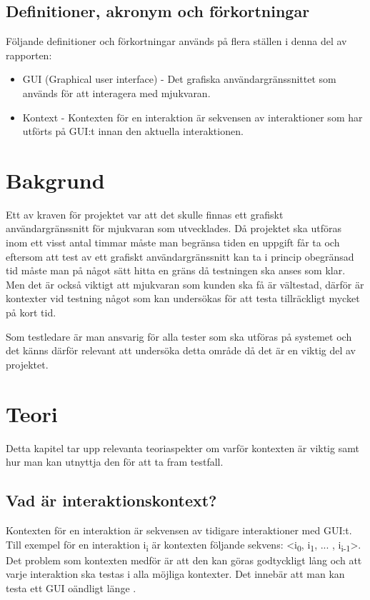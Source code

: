 \subsection{Definitioner, akronym och förkortningar}
Följande definitioner och förkortningar används på flera ställen i denna del av rapporten:
\begin{itemize}
	\item GUI (Graphical user interface) - Det grafiska användargränssnittet som används för att interagera med mjukvaran.
	\item Kontext - Kontexten för en interaktion är sekvensen av interaktioner som har utförts på GUI:t innan den aktuella interaktionen.
\end{itemize}

\section{Bakgrund}
\label{sec:background-holmberg}

Ett av kraven för projektet var att det skulle finnas ett grafiskt användargränssnitt för mjukvaran som utvecklades. Då projektet ska utföras inom ett visst antal timmar måste man begränsa tiden en uppgift får ta och eftersom att test av ett grafiskt användargränssnitt kan ta i princip obegränsad tid måste man på något sätt hitta en gräns då testningen ska anses som klar. Men det är också viktigt att mjukvaran som kunden ska få är vältestad, därför är kontexter vid testning något som kan undersökas för att testa tillräckligt mycket på kort tid.

Som testledare är man ansvarig för alla tester som ska utföras på systemet och det känns därför relevant att undersöka detta område då det är en viktig del av projektet.

\section{Teori}
\label{sec:theory-holmberg}

Detta kapitel tar upp relevanta teoriaspekter om varför kontexten är viktig samt hur man kan utnyttja den för att ta fram testfall.

\subsection{Vad är interaktionskontext?}

Kontexten för en interaktion är sekvensen av tidigare interaktioner med GUI:t. Till exempel för en interaktion i\textsubscript{i} är kontexten följande sekvens: <i\textsubscript{0}, i\textsubscript{1},  ... , i\textsubscript{i-1}>. Det problem som kontexten medför är att den kan göras godtyckligt lång och att varje interaktion ska testas i alla möjliga kontexter. Det innebär att man kan testa ett GUI oändligt länge \cite{yuan2011gui}. 

